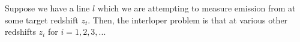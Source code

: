 \documentclass{aastex62}
\begin{document}
Suppose we have a line $l$ which we are attempting to measure emission from at
some target redshift $z_t$. Then, the interloper problem is that at various other redshifts $z_i$ for $i=1,2,3,...$


\end{document}
